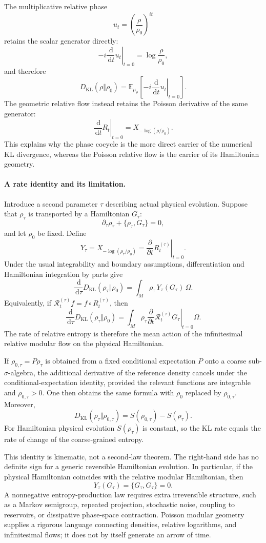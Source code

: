 \documentclass[a4paper,11pt]{article}
\theoremstyle{definition}
\newcommand{\dd}{\,\mathrm{d}}
\newcommand{\KLL}{D_{\mathrm{KL}}}
\begin{document}
The multiplicative relative phase
\[
u_t
=
\left(\frac{\rho}{\rho_0}\right)^{it}
\]
retains the scalar generator directly:
\[
-i\left.\frac{\dd}{\dd t}u_t\right|_{t=0}
=
\log\frac{\rho}{\rho_0},
\]
and therefore
\[
\KLL(\rho\Vert\rho_0)
=
\mathbb E_{\mu_\rho}\!\left[
-i\left.\frac{\dd}{\dd t}u_t\right|_{t=0}
\right].
\]
The geometric relative flow instead retains the Poisson derivative of the same generator:
\[
\left.\frac{\dd}{\dd t}R_t\right|_{t=0}
=
X_{-\log(\rho/\rho_0)}.
\]
This explains why the phase cocycle is the more direct carrier of the numerical KL divergence, whereas the Poisson relative flow is the carrier of its Hamiltonian geometry.

\paragraph{A rate identity and its limitation.}
Introduce a second parameter $\tau$ describing actual physical evolution.  Suppose that $\rho_\tau$ is transported by a Hamiltonian $G_\tau$:
\[
\partial_\tau\rho_\tau+\{\rho_\tau,G_\tau\}=0,
\]
and let $\rho_0$ be fixed.  Define
\[
Y_\tau
=
X_{-\log(\rho_\tau/\rho_0)}
=
\left.\frac{\partial}{\partial t}R_t^{(\tau)}\right|_{t=0}.
\]
Under the usual integrability and boundary assumptions, differentiation and Hamiltonian integration by parts give
\[
\boxed{
\frac{\dd}{\dd\tau}
\KLL(\rho_\tau\Vert\rho_0)
=
\int_M \rho_\tau\,Y_\tau(G_\tau)\,\Omega.
}
\]
Equivalently, if $\mathcal R_t^{(\tau)}f=f\circ R_t^{(\tau)}$, then
\[
\frac{\dd}{\dd\tau}
\KLL(\rho_\tau\Vert\rho_0)
=
\int_M\rho_\tau
\left.
\frac{\partial}{\partial t}
\mathcal R_t^{(\tau)}G_\tau
\right|_{t=0}
\Omega.
\]
The rate of relative entropy is therefore the mean action of the infinitesimal relative modular flow on the physical Hamiltonian.

If $\rho_{0,\tau}=P\rho_\tau$ is obtained from a fixed conditional expectation $P$ onto a coarse sub-$\sigma$-algebra, the additional derivative of the reference density cancels under the conditional-expectation identity, provided the relevant functions are integrable and $\rho_{0,\tau}>0$.  One then obtains the same formula with $\rho_0$ replaced by $\rho_{0,\tau}$.  Moreover,
\[
\KLL(\rho_\tau\Vert\rho_{0,\tau})
=
S(\rho_{0,\tau})-S(\rho_\tau).
\]
For Hamiltonian physical evolution $S(\rho_\tau)$ is constant, so the KL rate equals the rate of change of the coarse-grained entropy.

This identity is kinematic, not a second-law theorem.  The right-hand side has no definite sign for a generic reversible Hamiltonian evolution.  In particular, if the physical Hamiltonian coincides with the relative modular Hamiltonian, then
\[
Y_\tau(G_\tau)
=
\{G_\tau,G_\tau\}=0.
\]
A nonnegative entropy-production law requires extra irreversible structure, such as a Markov semigroup, repeated projection, stochastic noise, coupling to reservoirs, or dissipative phase-space contraction.  Poisson modular geometry supplies a rigorous language connecting densities, relative logarithms, and infinitesimal flows; it does not by itself generate an arrow of time.
\end{document}
